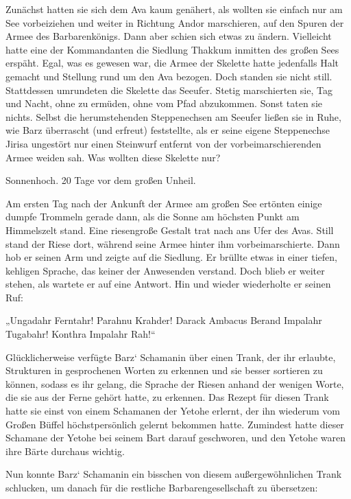 Zunächst hatten sie sich dem Ava kaum genähert, als wollten sie einfach nur am See vorbeiziehen und weiter in Richtung Andor marschieren, auf den Spuren der Armee des Barbarenkönigs. Dann aber schien sich etwas zu ändern. Vielleicht hatte eine der Kommandanten die Siedlung Thakkum inmitten des großen Sees erspäht. Egal, was es gewesen war, die Armee der Skelette hatte jedenfalls Halt gemacht und Stellung rund um den Ava bezogen. Doch standen sie nicht still. Stattdessen umrundeten die Skelette das Seeufer. Stetig marschierten sie, Tag und Nacht, ohne zu ermüden, ohne vom Pfad abzukommen. Sonst taten sie nichts. Selbst die herumstehenden Steppenechsen am Seeufer ließen sie in Ruhe, wie Barz überrascht (und erfreut) feststellte, als er seine eigene Steppenechse Jirisa ungestört nur einen Steinwurf entfernt von der vorbeimarschierenden Armee weiden sah. Was wollten diese Skelette nur?



\trennzeichen



Sonnenhoch. 20 Tage vor dem großen Unheil.\bigskip



Am ersten Tag nach der Ankunft der Armee am großen See ertönten einige dumpfe Trommeln gerade dann, als die Sonne am höchsten Punkt am Himmelszelt stand. Eine riesengroße Gestalt trat nach ans Ufer des Avas. Still stand der Riese dort, während seine Armee hinter ihm vorbeimarschierte. Dann hob er seinen Arm und zeigte auf die Siedlung. Er brüllte etwas in einer tiefen, kehligen Sprache, das keiner der Anwesenden verstand. Doch blieb er weiter stehen, als wartete er auf eine Antwort. Hin und wieder wiederholte er seinen Ruf:

„Ungadahr Ferntahr! Parahnu Krahder! Darack Ambacus Berand Impalahr Tugabahr! Konthra Impalahr Rah!“

Glücklicherweise verfügte Barz‘ Schamanin über einen Trank, der ihr erlaubte, Strukturen in gesprochenen Worten zu erkennen und sie besser sortieren zu können, sodass es ihr gelang, die Sprache der Riesen anhand der wenigen Worte, die sie aus der Ferne gehört hatte, zu erkennen. Das Rezept für diesen Trank hatte sie einst von einem Schamanen der Yetohe erlernt, der ihn wiederum vom Großen Büffel höchstpersönlich gelernt bekommen hatte. Zumindest hatte dieser Schamane der Yetohe bei seinem Bart darauf geschworen, und den Yetohe waren ihre Bärte durchaus wichtig.

Nun konnte Barz‘ Schamanin ein bisschen von diesem außergewöhnlichen Trank schlucken, um danach für die restliche Barbarengesellschaft zu übersetzen:

